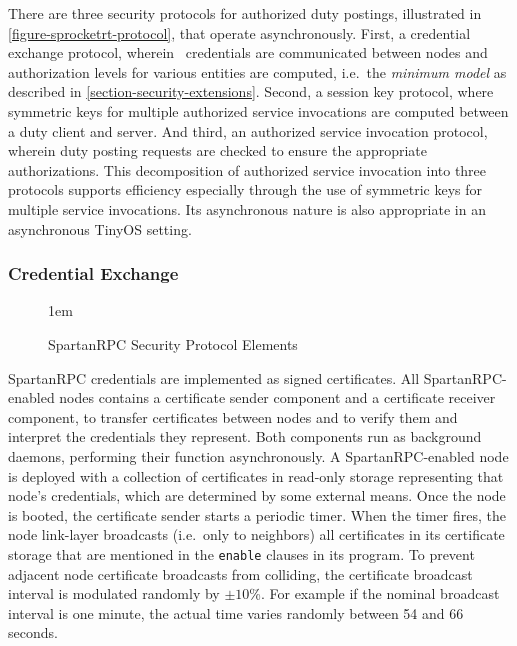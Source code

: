 There are three security protocols for authorized duty postings,
illustrated in \autoref{figure-sprocketrt-protocol}, that operate
asynchronously. First, a credential exchange protocol, wherein
\RT\ credentials are communicated between nodes and authorization
levels for various entities are computed, i.e.~the \emph{minimum
  model} as described in
\autoref{section-security-extensions}. Second, a session key protocol,
where symmetric keys for multiple authorized service invocations are
computed between a duty client and server. And third, an authorized
service invocation protocol, wherein duty posting requests are checked
to ensure the appropriate authorizations. This decomposition of
authorized service invocation into three protocols supports efficiency
especially through the use of symmetric keys for multiple service
invocations. Its asynchronous nature is also appropriate in an
asynchronous TinyOS setting.

\subsubsection{Credential Exchange}

\begin{figure}[t]
  
  \centerline{\raise 1em\box\graph}
  \vspace{2mm}
  \caption{SpartanRPC Security Protocol Elements}
  \label{figure-sprocketrt-protocol}
\end{figure}

\label{section-certificate-format}

SpartanRPC credentials are implemented as signed certificates. All
SpartanRPC-enabled nodes contains a certificate sender component and a
certificate receiver component, to transfer certificates between nodes
and to verify them and interpret the credentials they represent.  Both
components run as background daemons, performing their function
asynchronously.  A SpartanRPC-enabled node is deployed with a
collection of certificates in read-only storage representing that
node's credentials, which are determined by some external means.  Once
the node is booted, the certificate sender starts a periodic
timer. When the timer fires, the node link-layer broadcasts (i.e.~only
to neighbors) all certificates in its certificate storage that are
mentioned in the \texttt{enable} clauses in its program.  To prevent
adjacent node certificate broadcasts from colliding, the certificate
broadcast interval is modulated randomly by $\pm 10$\%. For example if
the nominal broadcast interval is one minute, the actual time varies
randomly between 54 and 66 seconds.

